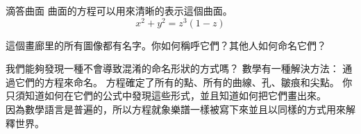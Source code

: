 \begin{surferPage}{滴答曲面}
曲面的方程可以用來清晰的表示這個曲面。 \\
\smallskip
\[x^2 + y^2	= z^3	(1 - z) \]

\singlespacing

這個畫廊里的所有圖像都有名字。你如何稱呼它們？其他人如何命名它們？\\

\vspace{0.3cm}

我們能夠發現一種不會導致混淆的命名形狀的方式嗎？ 數學有一種解決方法： 通過它們的方程來命名。 方程確定了所有的點、所有的曲線、孔、皺痕和尖點。 你只須知道如何在它們的公式中發現這些形式，並且知道如何把它們畫出來。\\

\vspace{0.3cm}
因為數學語言是普遍的，所以方程就象樂譜一樣被寫下來並且以同樣的方式用來解釋世界。
\end{surferPage}
